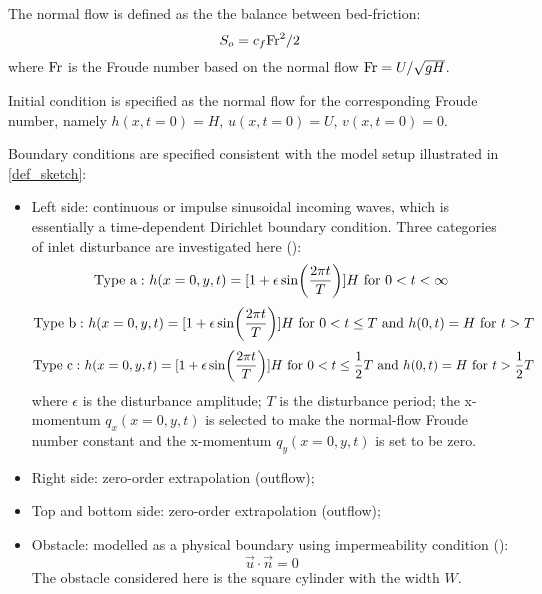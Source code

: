 \documentclass{jfm}
\newcommand{\fr}{{\rm{Fr}}}
\begin{document}
The normal flow is defined as the the balance between bed-friction:
\begin{equation}
	S_o = {c_f} \fr^2 / {2}
	\label{normalFlow}
\end{equation}
where $\fr$ is the Froude number based on the normal flow $\fr=U/\sqrt{gH}$.


Initial condition is specified as the normal flow for the corresponding Froude number, namely $h(x, t=0)=H,\, u(x, t=0)=U,\, v(x, t=0)=0$.

Boundary conditions are specified consistent with the model setup illustrated in \autoref{def_sketch}:
\begin{itemize}
	\item Left side: continuous or impulse sinusoidal incoming waves, which is essentially a time-dependent Dirichlet boundary condition. Three categories of inlet disturbance are investigated here (\cite{Yu2021}):
\begin{equation}
{\rm Type \ a:}  \ h(x=0,y, t)=[1+\epsilon\sin (\frac{2 \pi t}{T})] H  \ {\rm for} \  0 < t < \infty
\label{type-a}
\end{equation}
\begin{equation}
{\rm Type \ b:}  \  h(x=0,y,  t)=[1+\epsilon\sin  (\frac{2 \pi t}{T})] H  \ {\rm for} \  0 < t \le T \ {\rm and}	\  h(0, t)={H} \ {\rm for} \   t >  T
\label{type-b}
\end{equation}
\begin{equation}
{\rm Type \ c:}  \  h(x=0,y,  t)=[1+\epsilon\sin (\frac{2 \pi t}{T})] H \ {\rm for} \  0 < t \le \frac{1}{2} T \ {\rm and}	\   h(0, t)={H} \ {\rm for} \   t > \frac{1}{2} T
\label{type-c}
\end{equation}
where $\epsilon$ is the disturbance amplitude; $T$ is the disturbance period; the x-momentum $q_x(x=0,y,  t)$ is selected to make the normal-flow Froude number constant and the x-momentum $q_y(x=0,y,  t)$ is set to be zero.
	\item Right side: zero-order extrapolation (outflow);
	\item Top and bottom side: zero-order extrapolation (outflow);
	\item Obstacle: modelled as a physical boundary using impermeability condition (\cite{Hervouet2007}):
	\begin{equation}
		\vec{u} \cdot \vec{n}=0
		\label{obstacleBC}
	\end{equation}
The obstacle considered here is the square cylinder with the width $W$.
\end{itemize}
\end{document}
